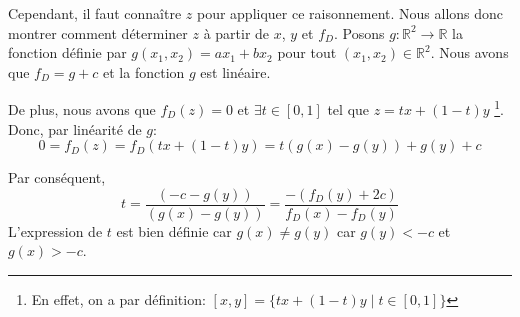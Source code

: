 Cependant, il faut connaître $z$ pour appliquer ce raisonnement. Nous allons
donc montrer comment déterminer $z$ à partir de $x$, $y$ et $f_D$.
Posons $g: \mathbb{R}^2 \to \mathbb{R}$ la fonction définie par
$g (x_1, x_2) =  a x_1 + b x_2$ pour tout $(x_1, x_2)\in\mathbb{R}^2$.
Nous avons que $f_D = g + c $ et la fonction $g$ est linéaire.

De plus, nous avons que $f_D(z) = 0$ et $\exists t \in [0,1]$ tel que
$ z = tx+ (1-t)y$
\footnote{En effet, on a par définition: $[x, y] = \{tx + (1 - t)y\mid t\in [0,1]\}$}.
Donc, par linéarité de $g$:
\begin{equation}
  0 = f_D(z)  = f_D (tx+ (1-t)y) = t(g(x)-g(y))+g(y)+c
\end{equation}

Par conséquent,
\begin{equation} \label{eq:t}
    t = \frac{(-c - g(y))}{(g(x)-g(y))} = \frac{-(f_D(y)+2c)}{f_D(x)-f_D(y)}
\end{equation}
L'expression de $t$ est bien définie car  $g(x) \neq g(y)$ car $ g(y) < -c  $ et $g(x) > -c$.
